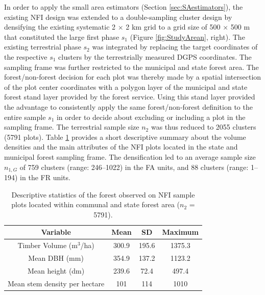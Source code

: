 \documentclass[remotesensing,article,accept,moreauthors,pdftex,10pt,a4paper]{Definitions/mdpi}
\begin{document}
In order to apply the small area estimators (Section \ref{sec:SAestimators}), the existing NFI design was extended to a double-sampling cluster design by densifying the existing systematic 2 $\times$ 2 km grid to a grid size of 500 $\times$ 500 m that constituted the large first phase $s_1$ (Figure \ref{fig:StudyArean}, {right}). The existing terrestrial phase $s_2$ was integrated by replacing the target coordinates of the respective $s_1$ clusters by the terrestrially measured DGPS coordinates. The sampling frame was further restricted to the municipal and state forest area. The forest/non-forest decision for each plot was thereby made by a spatial intersection of the plot center coordinates with a polygon layer of the municipal and state forest stand layer provided by the forest service. Using this stand layer provided the advantage to consistently apply the same forest/non-forest definition to the entire sample $s_1$ in order to decide about excluding or including a plot in the sampling frame. The terrestrial sample size $n_2$ was thus reduced to 2055 clusters (5791 plots). Table \ref{tab:fieldata} provides a short descriptive summary about the volume densities and the main attributes of the NFI plots located in the state and municipal forest sampling frame. The densification led to an average sample size $n_{1,G}$ of 759  clusters (range: 246--1022) in the FA units, and 88 clusters (range: 1--194) in the FR units.


\begin{table}[H]
	\begin{center}
	\caption{Descriptive statistics of the forest observed on NFI sample plots located within communal and state forest area ($n_2$  =  5791).}
	\label{tab:fieldata}
	{\small %
	\begin{tabular}{cccc}
		\toprule
		\textbf{Variable} & \textbf{Mean} & \textbf{SD} & \textbf{Maximum} \\ 
		\midrule
Timber Volume (m$^3$/ha) & 300.9 & 195.6 & 1375.3 \\
Mean DBH (mm) & 354.9 & 137.2 & 1123.2 \\
Mean height (dm) & 239.6 & 72.4 & 497.4 \\
Mean stem density per hectare & 101  & 114 & 1010 \\
\bottomrule
\end{tabular}
}%
\end{center}
\end{table}




\end{document}
